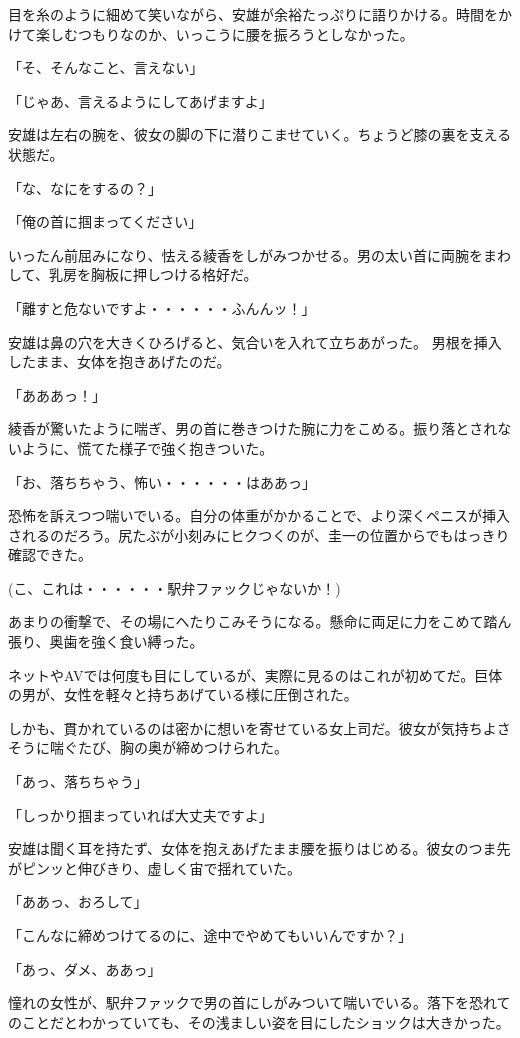 ﻿\documentclass[book,tate]{jlreq}
\begin{document}
目を糸のように細めて笑いながら、安雄が余裕たっぷりに語りかける。時間をかけて楽しむつもりなのか、いっこうに腰を振ろうとしなかった。

「そ、そんなこと、言えない」

「じゃあ、言えるようにしてあげますよ」

安雄は左右の腕を、彼女の脚の下に潜りこませていく。ちょうど膝の裏を支える状態だ。

「な、なにをするの？」

「俺の首に掴まってください」

いったん前屈みになり、怯える綾香をしがみつかせる。男の太い首に両腕をまわして、乳房を胸板に押しつける格好だ。

「離すと危ないですよ・・・・・・ふんんッ！」

安雄は鼻の穴を大きくひろげると、気合いを入れて立ちあがった。 男根を挿入したまま、女体を抱きあげたのだ。

「あああっ！」

綾香が驚いたように喘ぎ、男の首に巻きつけた腕に力をこめる。振り落とされないように、慌てた様子で強く抱きついた。

「お、落ちちゃう、怖い・・・・・・はああっ」

恐怖を訴えつつ喘いでいる。自分の体重がかかることで、より深くペニスが挿入されるのだろう。尻たぶが小刻みにヒクつくのが、圭一の位置からでもはっきり確認できた。

(こ、これは・・・・・・駅弁ファックじゃないか！)

あまりの衝撃で、その場にへたりこみそうになる。懸命に両足に力をこめて踏ん張り、奥歯を強く食い縛った。

ネットやAVでは何度も目にしているが、実際に見るのはこれが初めてだ。巨体の男が、女性を軽々と持ちあげている様に圧倒された。

しかも、貫かれているのは密かに想いを寄せている女上司だ。彼女が気持ちよさそうに喘ぐたび、胸の奥が締めつけられた。

「あっ、落ちちゃう」

「しっかり掴まっていれば大丈夫ですよ」

安雄は聞く耳を持たず、女体を抱えあげたまま腰を振りはじめる。彼女のつま先がピンッと伸びきり、虚しく宙で揺れていた。

「ああっ、おろして」

「こんなに締めつけてるのに、途中でやめてもいいんですか？」

「あっ、ダメ、ああっ」

憧れの女性が、駅弁ファックで男の首にしがみついて喘いでいる。落下を恐れてのことだとわかっていても、その浅ましい姿を目にしたショックは大きかった。
\end{document}
